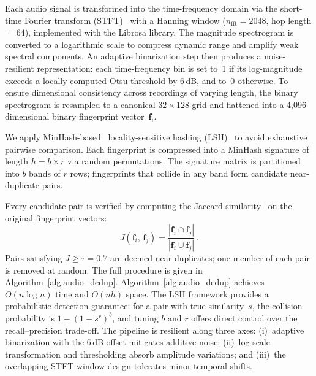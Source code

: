 \documentclass[sigconf, nonacm]{acmart}
\begin{document}
Each audio signal is transformed into the time-frequency domain via the short-time Fourier transform (STFT)~\cite{zhang2015sift} with a Hanning window ($n_{\text{fft}}{=}2048$, hop length${=}64$), implemented with the Librosa library. The magnitude spectrogram is converted to a logarithmic scale to compress dynamic range and amplify weak spectral components. An adaptive binarization step then produces a noise-resilient representation: each time-frequency bin is set to~1 if its log-magnitude exceeds a locally computed Otsu threshold by 6\,dB, and to~0 otherwise. To ensure dimensional consistency across recordings of varying length, the binary spectrogram is resampled to a canonical $32 \times 128$ grid and flattened into a 4,096-dimensional binary fingerprint vector~$\mathbf{f}_i$.


We apply MinHash-based~\cite{broder1997resemblance} locality-sensitive hashing (LSH)~\cite{datar2004lsh} to avoid exhaustive pairwise comparison. Each fingerprint is compressed into a MinHash signature of length $h = b \times r$ via random permutations. The signature matrix is partitioned into $b$ bands of $r$ rows; fingerprints that collide in any band form candidate near-duplicate pairs.

Every candidate pair is verified by computing the Jaccard similarity~\cite{leskovec2014miningjaccard} on the original fingerprint vectors:
\vspace{-1mm}
\begin{equation}\label{eq:jaccard_audio}
    J(\mathbf{f}_i,\, \mathbf{f}_j) = \frac{|\mathbf{f}_i \cap \mathbf{f}_j|}{|\mathbf{f}_i \cup \mathbf{f}_j|}\,.
\end{equation}
\vspace{-1mm}
Pairs satisfying $J \geq \tau = 0.7$ are deemed near-duplicates; one member of each pair is removed at random. The full procedure is given in Algorithm~\ref{alg:audio_dedup}.
Algorithm~\ref{alg:audio_dedup} achieves $O(n \log n)$ time and $O(nh)$ space. The LSH framework provides a probabilistic detection guarantee: for a pair with true similarity~$s$, the collision probability is $1 - (1 - s^r)^b$, and tuning $b$ and $r$ offers direct control over the recall--precision trade-off.
The pipeline is resilient along three axes: (i)~adaptive binarization with the 6\,dB offset mitigates additive noise; (ii)~log-scale transformation and thresholding absorb amplitude variations; and (iii)~the overlapping STFT window design tolerates minor temporal shifts.
\end{document}
